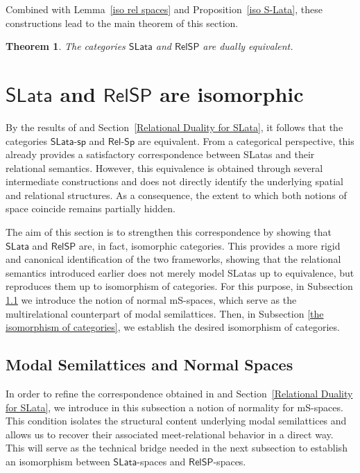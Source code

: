 \documentclass{article}
\newtheorem{theorem}{\bf Theorem}[section]
\begin{document}
Combined with Lemma~\ref{iso rel spaces} and Proposition~\ref{iso S-Lata}, these constructions lead to the main theorem of this section.

\begin{theorem}\label{Relational duality for SLatas}
The categories $\mathsf{SLata}$ and $\mathsf{RelSP}$ are dually equivalent.
\end{theorem}

\section{$\mathsf{SLata}$ and $\mathsf{RelSP}$ are isomorphic}\label{sec: The isomorphism}

By the results of \cite{GPZ} and Section~\ref{Relational Duality for SLata}, it follows that the categories $\mathsf{SLata\text{-}sp}$ and $\mathsf{Rel\text{-}Sp}$ are equivalent. From a categorical perspective, this already provides a satisfactory correspondence between SLatas and their relational semantics. However, this equivalence is obtained through several intermediate constructions and does not directly identify the underlying spatial and relational structures. As a consequence, the extent to which both notions of space coincide remains partially hidden.
\medskip

The aim of this section is to strengthen this correspondence by showing that $\mathsf{SLata}$ and $\mathsf{RelSP}$ are, in fact, isomorphic categories. This provides a more rigid and canonical identification of the two frameworks, showing that the relational semantics introduced earlier does not merely model SLatas up to equivalence, but reproduces them up to isomorphism of categories. For this purpose, in Subsection \ref{Modal Semilattices and Normal Spaces} we introduce the notion of normal mS-spaces, which serve as the multirelational counterpart of modal semilattices. Then, in Subsection \ref{the isomorphism of categories}, we establish the desired isomorphism of categories.


\subsection{Modal Semilattices and Normal Spaces}\label{Modal Semilattices and Normal Spaces}

In order to refine the correspondence obtained in \cite{GPZ} and Section~\ref{Relational Duality for SLata}, we introduce in this subsection a notion of normality for mS-spaces. This condition isolates the structural content underlying modal semilattices and allows us to recover their associated meet-relational behavior in a direct way. This will serve as the technical bridge needed in the next subsection to establish an isomorphism between $\mathsf{SLata}$-spaces and $\mathsf{RelSP}$-spaces.
\end{document}
